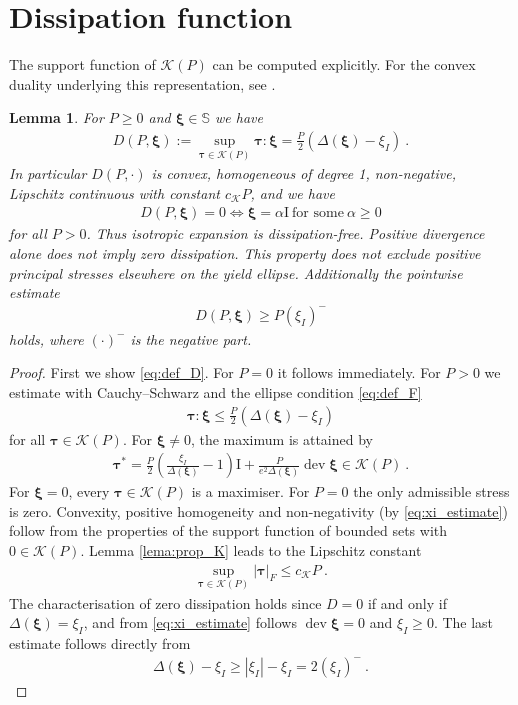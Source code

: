 \documentclass{article}
\newtheorem{lemma}[theorem]{Lemma}
\theoremstyle{definition}
\newcommand{\bftau}{\boldsymbol{\tau}}
\newcommand{\bfxi}{\boldsymbol{\xi}}
\newcommand{\bfI}{\boldsymbol{\mathrm{I}}}
\newcommand{\K}{\mathcal{K}}
\DeclareMathOperator{\dev}{dev}
\begin{document}
\section{Dissipation function}
The support function of $\K(P)$ can be computed explicitly. For the convex
duality underlying this representation, see \cite[Chapter I]{ET99}.
\begin{lemma}\label{lem:prop_D}
    For $P\geq 0$ and $\bfxi \in \mathbb S$ we have
    \begin{align}
        D(P,\bfxi) := \sup_{\bftau\in\K(P)} \bftau : \bfxi = \frac{P}{2}(\Delta(\bfxi)-\xi_I) \ .
        \label{eq:def_D}
    \end{align}
    In particular $D(P,\cdot)$ is convex, homogeneous of degree 1, non-negative,
    Lipschitz continuous with constant $c_\K P$, and we have
    \begin{align}
        D(P,\bfxi) = 0 \Leftrightarrow \bfxi = \alpha \bfI \ \text{for some}\ \alpha \geq 0 \label{eq:dissipationfree}
    \end{align}
    for all $P>0$. Thus isotropic expansion is dissipation-free. Positive
divergence alone does not imply zero dissipation. This property does not
exclude positive principal stresses elsewhere on the yield ellipse.
Additionally the pointwise estimate
    \begin{align}
        D(P, \bfxi) \geq P(\xi_I)^- \label{eq:negativ_part_D}
    \end{align}
    holds, where $(\cdot)^-$ is the negative part.
\end{lemma}
\begin{proof}
    First we show \eqref{eq:def_D}. For $P=0$ it follows immediately. For $P>0$ we estimate with Cauchy--Schwarz and
    the ellipse condition \eqref{eq:def_F}
    \begin{align*}
        \bftau : \bfxi \leq \frac{P}{2}(\Delta(\bfxi)-\xi_I)
    \end{align*}
    for all $\bftau \in \K(P)$. For $\bfxi\ne0$, the maximum is attained by
    \begin{align*}
        \bftau^* = \frac{P}{2}\left(\frac{\xi_I}{\Delta(\bfxi)}-1\right) \bfI + \frac{P}{e^2\Delta(\bfxi)}\dev\bfxi \in \K(P) \ .
    \end{align*}
    For $\bfxi=0$, every $\bftau\in\K(P)$ is a maximiser. For $P=0$ the
    only admissible stress is zero.
    Convexity, positive homogeneity and non-negativity (by \eqref{eq:xi_estimate}) follow from the properties of the support function of bounded sets with $0 \in \K(P)$. Lemma \ref{lema:prop_K} leads to the Lipschitz constant
    \begin{align*}
        \sup_{\bftau\in\K (P)} |\bftau|_F \leq c_\K P \ .
    \end{align*}
    The characterisation of zero dissipation holds since $D=0$ if and only if $\Delta(\bfxi) = \xi_I$, and from \eqref{eq:xi_estimate} follows $\dev \bfxi = 0$ and $\xi_I \geq 0$.
    The last estimate follows directly from
    \begin{align*}
        \Delta(\bfxi) - \xi_I \geq |\xi_I| - \xi_I = 2 (\xi_I)^- \ .
    \end{align*}
\end{proof}
\end{document}
